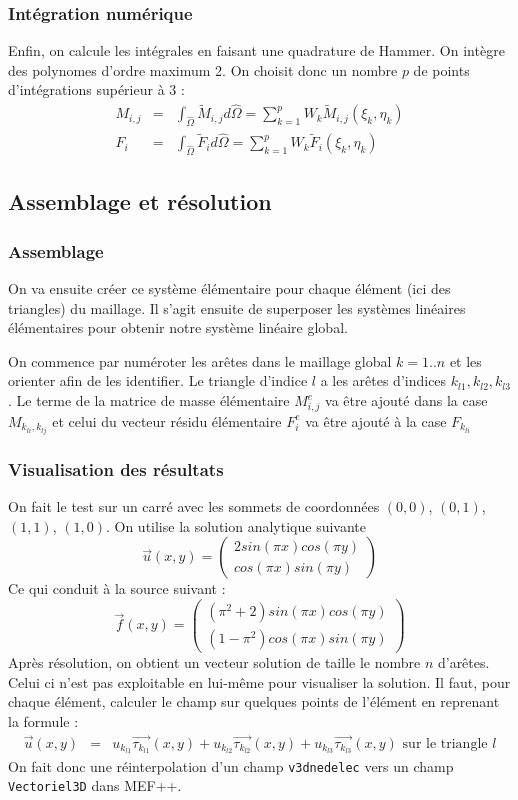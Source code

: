 \documentclass[a4paper,12pt]{article}
\begin{document}
\subsubsection{Intégration numérique}
Enfin, on calcule les intégrales en faisant une quadrature de Hammer.
On intègre des polynomes d'ordre maximum 2.
On choisit donc un nombre $p$ de points d'intégrations supérieur à 3 :
\begin{eqnarray*}
M_{i,j} &=& \int_{\hat{\Omega}} {\tilde{M}_{i,j} d\hat{\Omega}}
= \sum_{k=1}^{p} W_{k} \tilde{M}_{i,j}(\xi_{k}, \eta_{k})
\\
F_{i} &=& \int_{\hat{\Omega}} {\tilde{F}_{i} d\hat{\Omega}}
= \sum_{k=1}^{p} W_{k} \tilde{F}_{i}(\xi_{k}, \eta_{k})
\end{eqnarray*}

\subsection{Assemblage et résolution}
\subsubsection{Assemblage}
On va ensuite créer ce système élémentaire pour chaque élément (ici des triangles) du maillage. 
Il s'agit ensuite de superposer les systèmes linéaires élémentaires pour obtenir notre système linéaire global.

On commence par numéroter les arêtes dans le maillage global $k=1..n$ et les orienter afin de les identifier. 
Le triangle d'indice $l$ a les arêtes d'indices $k_{l1},k_{l2},k_{l3}$. Le terme de la matrice de masse élémentaire
$M_{i,j}^{e}$ va être ajouté dans la case $M_{k_{li}, k_{lj}}$ et celui du vecteur résidu élémentaire $F_{i}^{e}$ va être ajouté à la case $F_{k_{li}}$
\subsubsection{Visualisation des résultats}
On fait le test sur un carré avec les sommets de coordonnées $(0,0)$, $(0,1)$, $(1,1)$, $(1,0)$. On utilise la solution analytique suivante
\[
\vec{u}(x,y)=
\begin{pmatrix}
2sin(\pi x)cos(\pi y) \\
cos(\pi x)sin(\pi y)
\end{pmatrix}
\]
Ce qui conduit à la source suivant :
\[
\vec{f}(x,y)=
\begin{pmatrix}
(\pi^{2}+2)sin(\pi x)cos(\pi y) \\
(1-\pi^{2})cos(\pi x)sin(\pi y)
\end{pmatrix}
\]
Après résolution, on obtient un vecteur solution de taille le nombre $n$ d'arêtes. Celui ci n'est pas exploitable en lui-même pour visualiser la solution. 
Il faut, pour chaque élément, calculer le champ sur quelques points de l'élément en reprenant la formule :
\begin{eqnarray*}
\vec{u}(x,y) &=& u_{k_{l1}} \vec{\tau_{k_{l1}}}(x,y) + u_{k_{l2}} \vec{\tau_{k_{l2}}}(x,y) + u_{k_{l3}} \vec{\tau_{k_{l3}}}(x,y) \text{ sur le triangle } l
\end{eqnarray*}
On fait donc une réinterpolation d'un champ \texttt{v3dnedelec} vers un champ \texttt{Vectoriel3D} dans MEF++.
\end{document}
